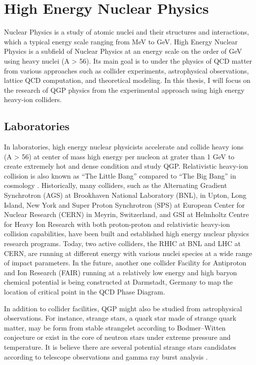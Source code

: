 \section{High Energy Nuclear Physics}

Nuclear Physics is a study of atomic nuclei and their structures and interactions, which a typical energy scale ranging from MeV to GeV. High Energy Nuclear Physics is a subfield of Nuclear Physics at an energy scale on the order of GeV using heavy nuclei (A > 56). Its main goal is to under the physics of QCD matter from various approaches such as collider experiments, astrophysical observations, lattice QCD computation, and theoretical modeling. In this thesis, I will focus on the research of QGP physics from the experimental approach using high energy heavy-ion colliders.

\subsection{Laboratories}

In laboratories, high energy nuclear physicists accelerate and collide heavy ions (A > 56) at center of mass high energy per nucleon at grater than 1 GeV to create extremely hot and dense condition and study QGP. Relativistic heavy-ion collision is also known as ``The Little Bang'' compared to ``The Big Bang'' in cosmology \cite{}. Historically, many colliders, such as the Alternating Gradient Synchrotron (AGS) at Brookhaven National Laboratory (BNL), in Upton, Long Island, New York and Super Proton Synchrotron (SPS) at European Center for Nuclear Research (CERN) in Meyrin, Switzerland, and GSI at Helmholtz Centre for Heavy Ion Research with both proton-proton and relativistic heavy-ion collision capabilities, have been built and established high energy nuclear physics research programs. Today, two active colliders, the RHIC at BNL and LHC at CERN, are running at different energy with various nuclei species at a wide range of impact parameters. In the future, another one collider Facility for Antiproton and Ion Research (FAIR) running at a relatively low energy and high baryon chemical potential is being constructed at Darmstadt, Germany to map the location of critical point in the QCD Phase Diagram. 

In addition to collider facilities, QGP might also be studied from astrophysical observations. For instance, strange stars, a quark star made of strange quark matter, may be form from stable strangelet according to Bodmer--Witten conjecture \cite{SQMReview} or exist in the core of neutron stars under extreme pressure and temperature. It is believe there are several potential strange stars candidates according to telescope observations and gamma ray burst analysis \cite{SS1,SS2,SS3}.

